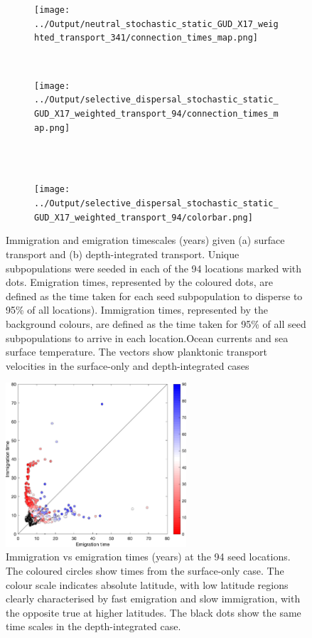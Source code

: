 \documentclass[12pt]{article}
\begin{document}
\begin{figure}[htp]
        \centering
\begin{subfigure}{.66\textwidth}
        \centering
         \texttt{[image: ../Output/neutral\_stochastic\_static\_GUD\_X17\_weighted\_transport\_341/connection\_times\_map.png]}
    \end{subfigure}%
    \\
\begin{subfigure}{.66\textwidth}
        \centering
         \texttt{[image: ../Output/selective\_dispersal\_stochastic\_static\_GUD\_X17\_weighted\_transport\_94/connection\_times\_map.png]}
    \end{subfigure}%
    \\~\\
\begin{subfigure}{.66\textwidth}
        \centering
         \texttt{[image: ../Output/selective\_dispersal\_stochastic\_static\_GUD\_X17\_weighted\_transport\_94/colorbar.png]}
    \end{subfigure}%
    \caption{Immigration and emigration timescales (years) given (a) surface transport and (b) depth-integrated transport. Unique subpopulations were seeded in each of the 94 locations marked with dots. Emigration times, represented by the coloured dots, are defined as the time taken for each seed subpopulation to disperse to 95\% of all locations). Immigration times, represented by the background colours, are defined as the time taken for 95\% of all seed subpopulations to arrive in each location.Ocean currents and sea surface temperature. The vectors show planktonic transport velocities in the surface-only and depth-integrated cases}
\label{Imm_vs_em}
\end{figure}


\begin{figure}[t!]
    \centering
        \includegraphics[width=0.6\textwidth]{../Figures/imm_vs_em.png}
    \caption{Immigration vs emigration times (years) at the 94 seed locations. The coloured circles show times from the surface-only case. The colour scale indicates absolute latitude, with low latitude regions clearly characterised by fast emigration and slow immigration, with the opposite true at higher latitudes. The black dots show the same time scales in the depth-integrated case.}
\label{Imm_vs_em}
\end{figure}
\end{document}
